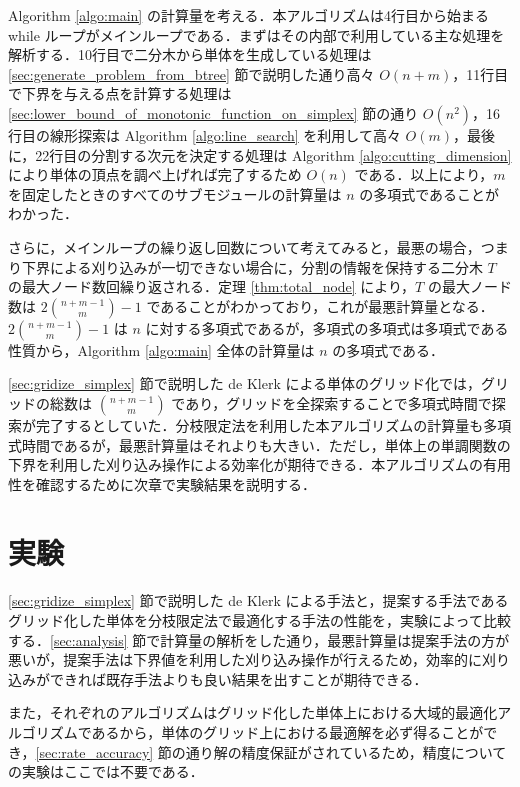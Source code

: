\documentclass[a4paper,11pt]{jreport}
\begin{document}
Algorithm \ref{algo:main} の計算量を考える．本アルゴリズムは4行目から始まる while ループがメインループである．まずはその内部で利用している主な処理を解析する．10行目で二分木から単体を生成している処理は \ref{sec:generate_problem_from_btree} 節で説明した通り高々 $ O(n + m) $，11行目で下界を与える点を計算する処理は \ref{sec:lower_bound_of_monotonic_function_on_simplex} 節の通り $ O(n^2) $，16行目の線形探索は Algorithm \ref{algo:line_search} を利用して高々 $ O(m) $，最後に，22行目の分割する次元を決定する処理は Algorithm \ref{algo:cutting_dimension} により単体の頂点を調べ上げれば完了するため $ O(n) $ である．以上により，$ m $ を固定したときのすべてのサブモジュールの計算量は $ n $ の多項式であることがわかった．\par
さらに，メインループの繰り返し回数について考えてみると，最悪の場合，つまり下界による刈り込みが一切できない場合に，分割の情報を保持する二分木 $ T $ の最大ノード数回繰り返される．定理 \ref{thm:total_node} により，$ T $ の最大ノード数は $ 2 \binom{n + m - 1}{m} - 1 $ であることがわかっており，これが最悪計算量となる．$ 2 \binom{n + m - 1}{m} - 1 $ は $ n $ に対する多項式であるが，多項式の多項式は多項式である性質から，Algorithm \ref{algo:main} 全体の計算量は $ n $ の多項式である．\par
\ref{sec:gridize_simplex} 節で説明した de Klerk による単体のグリッド化では，グリッドの総数は $ \binom{n + m - 1}{m} $ であり，グリッドを全探索することで多項式時間で探索が完了するとしていた．分枝限定法を利用した本アルゴリズムの計算量も多項式時間であるが，最悪計算量はそれよりも大きい．ただし，単体上の単調関数の下界を利用した刈り込み操作による効率化が期待できる．本アルゴリズムの有用性を確認するために次章で実験結果を説明する．

\chapter{実験}

\ref{sec:gridize_simplex} 節で説明した de Klerk による手法と，提案する手法であるグリッド化した単体を分枝限定法で最適化する手法の性能を，実験によって比較する．\ref{sec:analysis} 節で計算量の解析をした通り，最悪計算量は提案手法の方が悪いが，提案手法は下界値を利用した刈り込み操作が行えるため，効率的に刈り込みができれば既存手法よりも良い結果を出すことが期待できる．\par
また，それぞれのアルゴリズムはグリッド化した単体上における大域的最適化アルゴリズムであるから，単体のグリッド上における最適解を必ず得ることができ，\ref{sec:rate_accuracy} 節の通り解の精度保証がされているため，精度についての実験はここでは不要である．\par
\end{document}
